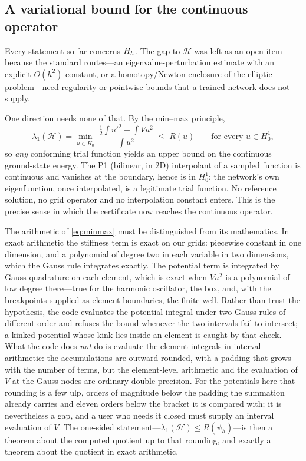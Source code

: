 \subsection{A variational bound for the continuous operator}
\label{sec:variational}

Every statement so far concerns $H_h$. The gap to $\mathcal H$ was left as an
open item because the standard routes---an eigenvalue-perturbation estimate
with an explicit $O(h^2)$ constant, or a homotopy/Newton enclosure of the
elliptic problem---need regularity or pointwise bounds that a trained network
does not supply.

One direction needs none of that. By the min--max principle,
\begin{equation}
  \lambda_1(\mathcal H) = \min_{u\in H^1_0}\ \frac{\tfrac12\int u'^2 + \int V u^2}{\int u^2}
  \;\le\; R(u)
  \qquad\text{for every } u\in H^1_0 ,
  \label{eq:minmax}
\end{equation}
so \emph{any} conforming trial function yields an upper bound on the
continuous ground-state energy. The P1 (bilinear, in 2D) interpolant of a
sampled function is continuous and vanishes at the boundary, hence is in
$H^1_0$: the network's own eigenfunction, once interpolated, is a legitimate
trial function. No reference solution, no grid operator and no interpolation
constant enters. This is the precise sense in which the certificate now
reaches the continuous operator.

The arithmetic of \eqref{eq:minmax} must be distinguished from its
mathematics. In exact arithmetic the stiffness term is exact on our grids:
piecewise constant in one dimension, and a polynomial of degree two in each
variable in two dimensions, which the Gauss rule integrates exactly. The
potential term is integrated by Gauss quadrature on each element, which is
exact when $V u^2$ is a polynomial of low degree there---true for the
harmonic oscillator, the box, and, with the breakpoints supplied as element
boundaries, the finite well. Rather than trust the hypothesis, the code
evaluates the potential integral under two Gauss rules of different order and
refuses the bound whenever the two intervals fail to intersect; a kinked
potential whose kink lies inside an element is caught by that check. What the
code does \emph{not} do is evaluate the element integrals in interval
arithmetic: the accumulations are outward-rounded, with a padding that grows
with the number of terms, but the element-level arithmetic and the evaluation
of $V$ at the Gauss nodes are ordinary double precision. For the potentials
here that rounding is a few ulp, orders of magnitude below the padding the
summation already carries and eleven orders below the bracket it is compared
with; it is nevertheless a gap, and a user who needs it closed must supply an
interval evaluation of $V$. The one-sided statement---$\lambda_1(\mathcal H)
\le R(\psi_h)$---is then a theorem about the computed quotient up to that
rounding, and exactly a theorem about the quotient in exact arithmetic.

